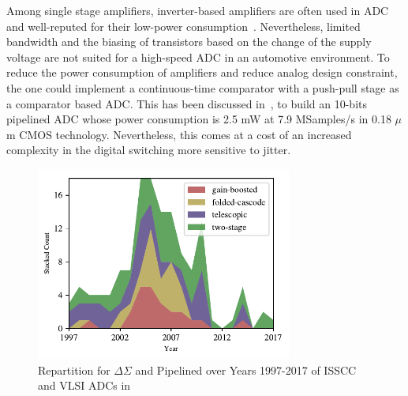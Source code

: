 Among single stage amplifiers, inverter-based amplifiers are often used in ADC and well-reputed for their low-power consumption~\cite{Selby2013,Ismail2016}. Nevertheless, limited bandwidth and the biasing of transistors based on the change of the supply voltage are not suited for a high-speed ADC in an automotive environment.
To reduce the power consumption of amplifiers and reduce analog design constraint, the one could implement a continuous-time comparator with a push-pull stage as a comparator based ADC\@. This has been discussed in~\cite{Fiorenza2006}, to build an 10-bits pipelined ADC whose power consumption is 2.5 mW at 7.9 MSamples/s in 0.18 \(\mu \)m CMOS technology. Nevertheless, this comes at a cost of an increased complexity in the digital switching more sensitive to jitter.

\begin{figure}[htp]
    \centering
    \includegraphics[width=0.75\textwidth]{Chapter7/Figs/amplifier_repartition.pdf}
    \caption{Repartition for \(\Delta\Sigma \) and Pipelined over Years 1997-2017 of ISSCC and VLSI ADCs in \cite{MurmannSurvey}}
    \label{fig:ota_over_year}
\end{figure}


